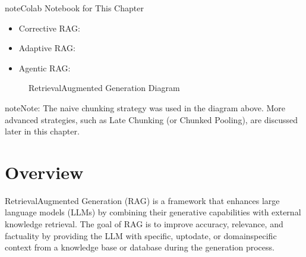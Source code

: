 \documentclass[letterpaper,11pt,english]{sphinxmanual}
\begin{document}
\begin{sphinxadmonition}{note}{Colab Notebook for This Chapter}
\begin{itemize}
\item {} 
\sphinxAtStartPar
Corrective RAG: 

\item {} 
\sphinxAtStartPar
Adaptive RAG: 

\item {} 
\sphinxAtStartPar
Agentic RAG: 

\end{itemize}
\end{sphinxadmonition}

\begin{figure}[htbp]
\centering
\capstart

\noindent{}
\caption{Retrieval\sphinxhyphen{}Augmented Generation Diagram}\label{\detokenize{rag:id53}}\label{\detokenize{rag:fig-rag}}\end{figure}

\begin{sphinxadmonition}{note}{Note:}
\sphinxAtStartPar
The naive chunking strategy was used in the diagram above. More advanced strategies,
such as Late Chunking  (or Chunked Pooling), are discussed later in this chapter.
\end{sphinxadmonition}


\section{Overview}
\label{\detokenize{rag:overview}}
\sphinxAtStartPar
Retrieval\sphinxhyphen{}Augmented Generation (RAG) is a framework that enhances large language models (LLMs)
by combining their generative capabilities with external knowledge retrieval. The goal of RAG
is to improve accuracy, relevance, and factuality by providing the LLM with specific, up\sphinxhyphen{}to\sphinxhyphen{}date,
or domain\sphinxhyphen{}specific context from a knowledge base or database during the generation process.
\end{document}
